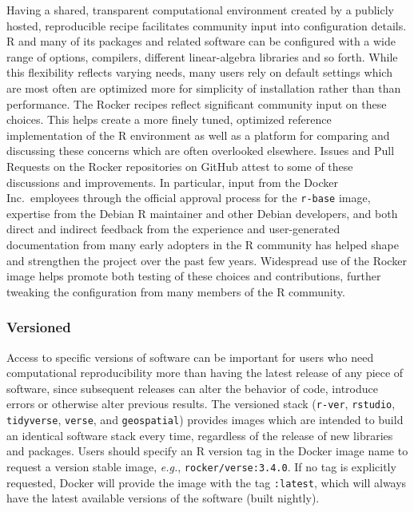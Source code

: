 Having a shared, transparent computational environment created by a
publicly hosted, reproducible recipe facilitates community input into
configuration details. R and many of its packages and related software
can be configured with a wide range of options, compilers, different
linear-algebra libraries and so forth. While this flexibility reflects
varying needs, many users rely on default settings which are most often
are optimized more for simplicity of installation rather than than
performance. The Rocker recipes reflect significant community input on
these choices. This helps create a more finely tuned, optimized
reference implementation of the R environment as well as a platform for
comparing and discussing these concerns which are often overlooked
elsewhere. Issues and Pull Requests on the Rocker repositories on GitHub
attest to some of these discussions and improvements. In particular,
input from the Docker Inc.~employees through the official approval
process for the \texttt{r-base} image, expertise from the Debian R
maintainer and other Debian developers, and both direct and indirect
feedback from the experience and user-generated documentation from many
early adopters in the R community has helped shape and strengthen the
project over the past few years. Widespread use of the Rocker image
helps promote both testing of these choices and contributions, further
tweaking the configuration from many members of the R community.

\subsubsection{Versioned}\label{versioned}

Access to specific versions of software can be important for users who
need computational reproducibility more than having the latest release
of any piece of software, since subsequent releases can alter the
behavior of code, introduce errors or otherwise alter previous results.
The versioned stack (\texttt{r-ver}, \texttt{rstudio},
\texttt{tidyverse}, \texttt{verse}, and \texttt{geospatial}) provides
images which are intended to build an identical software stack every
time, regardless of the release of new libraries and packages. Users
should specify an R version tag in the Docker image name to request a
version stable image, \emph{e.g.}, \texttt{rocker/verse:3.4.0}. If no
tag is explicitly requested, Docker will provide the image with the tag
\texttt{:latest}, which will always have the latest available versions
of the software (built nightly).

